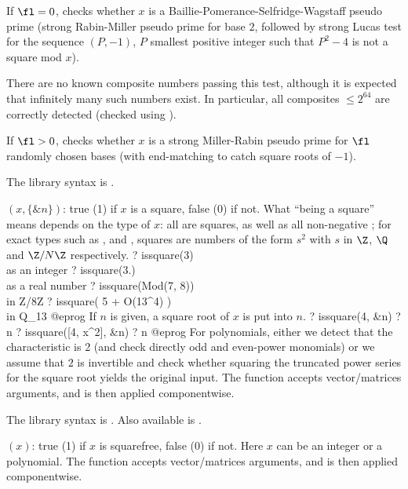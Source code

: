 If $\fl = 0$, checks whether $x$ is a Baillie-Pomerance-Selfridge-Wagstaff
pseudo prime (strong Rabin-Miller pseudo prime for base $2$, followed by
strong Lucas test for the sequence $(P,-1)$, $P$ smallest positive integer
such that $P^2 - 4$ is not a square mod $x$).

There are no known composite numbers passing this test, although it is
expected that infinitely many such numbers exist. In particular, all
composites $\leq 2^{64}$ are correctly detected (checked using
).

If $\fl > 0$, checks whether $x$ is a strong Miller-Rabin pseudo prime  for
$\fl$ randomly chosen bases (with end-matching to catch square roots of $-1$).

The library syntax is .

$(x,\{\&n\})$: \label{se:issquare}true (1) if $x$ is a square, false (0)
if not. What ``being a square'' means depends on the type of $x$: all
 are squares, as well as all non-negative ; for
exact types such as ,  and , squares are
numbers of the form $s^2$ with $s$ in $\Z$, $\Q$ and $\Z/N\Z$ respectively.
\bprog
? issquare(3)          \\ as an integer
? issquare(3.)         \\ as a real number
? issquare(Mod(7, 8))  \\ in Z/8Z
? issquare( 5 + O(13^4) )  \\ in Q_13
@eprog
If $n$ is given, a square root of $x$ is put into $n$.
\bprog
? issquare(4, &n)
? n
? issquare([4, x^2], &n)
? n
@eprog
For polynomials, either we detect that the characteristic is 2 (and check
directly odd and even-power monomials) or we assume that $2$ is invertible
and check whether squaring the truncated power series for the square root
yields the original input.
The function accepts vector/matrices arguments, and is then applied
componentwise.

The library syntax is .
Also available is .

$(x)$: \label{se:issquarefree}true (1) if $x$ is squarefree, false (0) if not. Here $x$ can be an
integer or a polynomial.
The function accepts vector/matrices arguments, and is then applied
componentwise.

